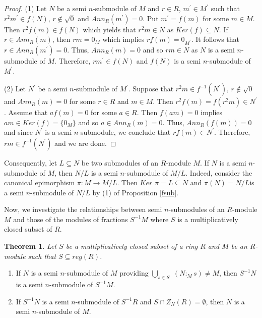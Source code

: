 \documentclass{amsart}%
\newtheorem{theorem}{Theorem}
\theoremstyle{plain}
\numberwithin{equation}{section}
\begin{document}
\begin{proof}
(1) Let $N$ be a semi $n$-submodule of $M$ and $r\in R$, $m^{\prime}\in
M^{\prime}$ such that $r^{2}m^{\prime}\in f(N)$, $r\notin\sqrt{0}$ and
$Ann_{R}(m^{\prime})=0$. Put $m^{\prime}=f(m)$ for some $m\in M.$ Then
$r^{2}f(m)\in f(N)$ which yields that $r^{2}m\in N$ as $Ker(f)\subseteq N$. If
$r\in Ann_{R}(m)$, then $rm=0_{M}$ which implies $rf(m)=0_{M^{\prime}}$. It
follows that $r\in Ann_{R}(m^{\prime})=0.$ Thus, $Ann_{R}(m)=0$ and so $rm\in
N$ as $N$ is a semi $n$-submodule of $M$. Therefore, $rm^{\prime}\in f(N)$ and
$f(N)$ is a semi $n$-submodule of $M^{\prime}$.

(2) Let $N^{\prime}$ be a semi $n$-submodule of $M^{\prime}$. Suppose that
$r^{2}m\in f^{-1}(N^{\prime})$, $r\notin\sqrt{0}$ and $Ann_{R}(m)=0$ for some
$r\in R$ and $m\in M$. Then $r^{2}f(m)=f(r^{2}m)\in N^{\prime}$. Assume that
$af(m)=0$ for some $a\in R.$ Then $f(am)=0$ implies $am\in Ker(f)=\{0_{M}\}$
and so $a\in Ann_{R}(m)=0$. Thus, $Ann_{R}(f(m))=0$ and since $N^{\prime}$ is
a semi $n$-submodule, we conclude that $rf(m)\in N^{\prime}$. Therefore,
$rm\in f^{-1}(N^{\prime})$ and we are done.
\end{proof}

Consequently, let $L\subseteq N$ be two submodules of an $R$-module $M$. If
$N$ is a semi $n$-submodule of $M$, then $N/L$ is a semi $n$-submodule of
$M/L.$ Indeed, consider the canonical epimorphism $\pi:M\rightarrow M/L$. Then
$Ker$ $\pi=L\subseteq N$ and $\pi(N)=N/L$is a semi $n$-submodule of $N/L$ by
(1) of Proposition \ref{fsub}.

Now, we investigate the relationships between semi $n$-submodules of an
$R$-module $M$ and those of the modules of fractions $S^{-1}M$ where $S$ is a
multiplicatively closed subset of $R$.

\begin{theorem}
\label{SM}Let $S$ be a multiplicatively closed subset of a ring $R$ and $M$ be
an $R$-module such that $S\subseteq reg(R)$.
\end{theorem}

\begin{enumerate}
\item If $N$ is a semi $n$-submodule of $M$ providing $%
{\displaystyle\bigcup\limits_{s\in S}}
$ $(N:_{M}s)\neq M$, then $S^{-1}N$ is a semi $n$-submodule of $S^{-1}M.$

\item If $S^{-1}N$ is a semi $n$-submodule of $S^{-1}R$ and $S\cap
Z_{N}(R)=\emptyset$, then $N$ is a semi $n$-submodule of $M.$
\end{enumerate}
\end{document}

